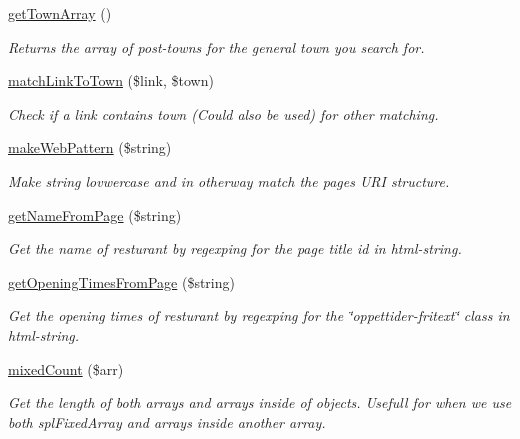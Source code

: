 \begin{DoxyCompactItemize}
\hyperlink{veganistan_8php_a80deef1c368c57a83751d69eee0f9bec}{get\+Town\+Array} ()
\begin{DoxyCompactList}\small\item\em Returns the array of post-\/towns for the general town you search for. \end{DoxyCompactList}\item 
\hyperlink{veganistan_8php_a036078d10f25b186e72c0a54943dc077}{match\+Link\+To\+Town} (\$link, \$town)
\begin{DoxyCompactList}\small\item\em Check if a link contains town (Could also be used) for other matching. \end{DoxyCompactList}\item 
\hyperlink{veganistan_8php_a7f0c7d546fe1fc26d7ba1e8b58bb7cde}{make\+Web\+Pattern} (\$string)
\begin{DoxyCompactList}\small\item\em Make string lovwercase and in otherway match the pages U\+RI structure. \end{DoxyCompactList}\item 
\hyperlink{veganistan_8php_ab4235042caee848a173cb153da0f29be}{get\+Name\+From\+Page} (\$string)
\begin{DoxyCompactList}\small\item\em Get the name of resturant by regexping for the page title id in html-\/string. \end{DoxyCompactList}\item 
\hyperlink{veganistan_8php_a96e15e817a7a149db3e0b45ce0067e13}{get\+Opening\+Times\+From\+Page} (\$string)
\begin{DoxyCompactList}\small\item\em Get the opening times of resturant by regexping for the \char`\"{}oppettider-\/fritext\char`\"{} class in html-\/string. \end{DoxyCompactList}\item 
\hyperlink{veganistan_8php_a3efb5bb55d51db5839c3e83b0f490c75}{mixed\+Count} (\$arr)
\begin{DoxyCompactList}\small\item\em Get the length of both arrays and arrays inside of objects. Usefull for when we use both spl\+Fixed\+Array and arrays inside another array. \end{DoxyCompactList}\end{DoxyCompactItemize}
